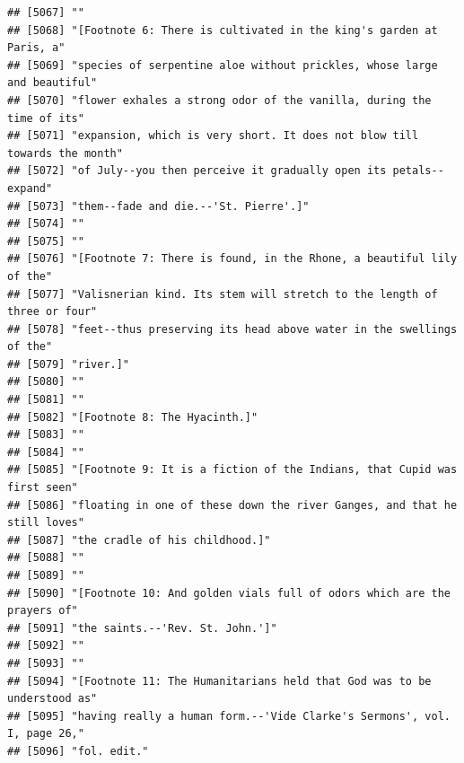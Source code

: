 \documentclass{article}\usepackage[]{graphicx}\usepackage[]{color}
\makeatletter
\newenvironment{kframe}{%
 \def\at@end@of@kframe{}%
 \ifinner\ifhmode%
  \def\at@end@of@kframe{\end{minipage}}%
  \begin{minipage}{\columnwidth}%
 \fi\fi%
 \def\FrameCommand##1{\hskip\@totalleftmargin \hskip-\fboxsep
 \colorbox{shadecolor}{##1}\hskip-\fboxsep
     \hskip-\linewidth \hskip-\@totalleftmargin \hskip\columnwidth}%
 \MakeFramed {\advance\hsize-\width
   \@totalleftmargin\z@ \linewidth\hsize
   \@setminipage}}%
 {\par\unskip\endMakeFramed%
 \at@end@of@kframe}
\newenvironment{knitrout}{}{} %
\makeatother
\begin{document}
\begin{knitrout}
\begin{kframe}
\begin{verbatim}
## [5067] ""                                                                            
## [5068] "[Footnote 6: There is cultivated in the king's garden at Paris, a"           
## [5069] "species of serpentine aloe without prickles, whose large and beautiful"      
## [5070] "flower exhales a strong odor of the vanilla, during the time of its"         
## [5071] "expansion, which is very short. It does not blow till towards the month"     
## [5072] "of July--you then perceive it gradually open its petals--expand"             
## [5073] "them--fade and die.--'St. Pierre'.]"                                         
## [5074] ""                                                                            
## [5075] ""                                                                            
## [5076] "[Footnote 7: There is found, in the Rhone, a beautiful lily of the"          
## [5077] "Valisnerian kind. Its stem will stretch to the length of three or four"      
## [5078] "feet--thus preserving its head above water in the swellings of the"          
## [5079] "river.]"                                                                     
## [5080] ""                                                                            
## [5081] ""                                                                            
## [5082] "[Footnote 8: The Hyacinth.]"                                                 
## [5083] ""                                                                            
## [5084] ""                                                                            
## [5085] "[Footnote 9: It is a fiction of the Indians, that Cupid was first seen"      
## [5086] "floating in one of these down the river Ganges, and that he still loves"     
## [5087] "the cradle of his childhood.]"                                               
## [5088] ""                                                                            
## [5089] ""                                                                            
## [5090] "[Footnote 10: And golden vials full of odors which are the prayers of"       
## [5091] "the saints.--'Rev. St. John.']"                                              
## [5092] ""                                                                            
## [5093] ""                                                                            
## [5094] "[Footnote 11: The Humanitarians held that God was to be understood as"       
## [5095] "having really a human form.--'Vide Clarke's Sermons', vol. I, page 26,"      
## [5096] "fol. edit."                                                                  

\end{verbatim}
\end{kframe}
\end{knitrout}
\end{document}
